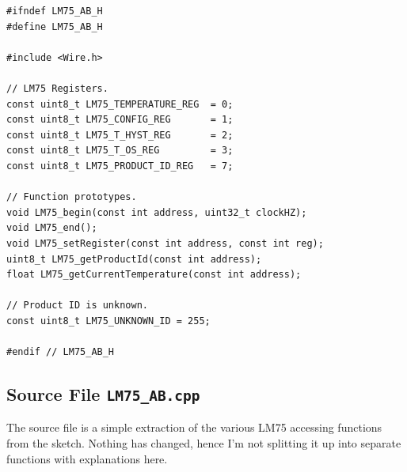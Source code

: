\begin{lstlisting}[caption={Library header file - \texttt{LM75\_AB.h}.},label={lst: LM75_AB - Library header file}, style=myArduino, firstnumber=1]
#ifndef LM75_AB_H
#define LM75_AB_H

#include <Wire.h>

// LM75 Registers.
const uint8_t LM75_TEMPERATURE_REG  = 0;
const uint8_t LM75_CONFIG_REG       = 1;
const uint8_t LM75_T_HYST_REG       = 2;
const uint8_t LM75_T_OS_REG         = 3;
const uint8_t LM75_PRODUCT_ID_REG   = 7;

// Function prototypes.
void LM75_begin(const int address, uint32_t clockHZ);
void LM75_end();
void LM75_setRegister(const int address, const int reg);
uint8_t LM75_getProductId(const int address);
float LM75_getCurrentTemperature(const int address);

// Product ID is unknown.
const uint8_t LM75_UNKNOWN_ID = 255;

#endif // LM75_AB_H
\end{lstlisting}

\subsection{Source File \texttt{LM75\_AB.cpp}}

The source file is a simple extraction of the various LM75 accessing functions from the  sketch. Nothing has changed, hence I'm not splitting it up into separate functions with explanations here.

